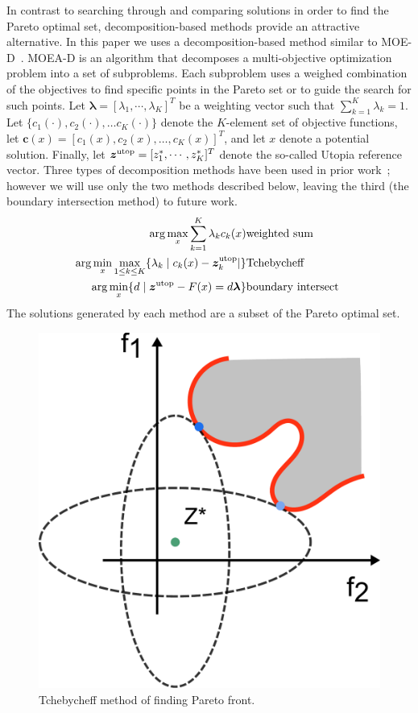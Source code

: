 \documentclass[phd]{byuprop}
\begin{document}
In contrast to searching through and comparing solutions in order to find the Pareto optimal set, decomposition-based methods provide an attractive alternative.  
In this paper we uses a decomposition-based method similar to MOE-D~\cite{Zhang2007}.  
MOEA-D is an algorithm that decomposes a multi-objective optimization problem into a set of subproblems.  
Each subproblem uses a weighed combination of the objectives to find specific points in the Pareto set or to guide the search for such points.  
Let $ \bm{\lambda} = [ \lambda_{1} , \cdots , \lambda_{K}  ]^{T} $ be a weighting vector such that $ \sum_{k=1}^{K} \lambda_{k} = 1 $.  
Let $\{c_{1}(\cdot), c_{2}(\cdot), \ldots c_{K}(\cdot)\}$ denote the $K$-element set of objective functions, let $\bm{c}(x) = [c_{1}(x), c_{2}(x), \ldots, c_{K}(x)]^T$, and let $x$ denote a potential solution.  
Finally, let $ \bm{z}^{\rm utop} = [z^{*}_{1}, \cdots , z^{*}_{K}]^{T} $ denote the so-called Utopia reference vector. %
Three types of decomposition methods have been used in prior work~\cite{Zhang2007}; however we will use only the two methods described below, leaving the third (the boundary intersection method) to future work.
\begin{eqnarray}
 \arg\max_x \sum_{k=1}^{K} \lambda_{k} c_{k} (x) & {\rm weighted \ sum} \label{eq:weighted}\\
 \arg\min_x\max_{1 \leq k \leq K}  \{ \lambda_{k} \mid c_{k}(x) - \bm{z}^{\rm utop}_{k}  | \} & {\rm Tchebycheff} \label{eq:Tchebycheff}\\
 \arg\min_x \{ d \mid \bm{z}^{\rm utop} - F(x) = d \bm{\lambda} \} & {\rm boundary \ intersect\ } \label{eq:boundary}
\end{eqnarray}
The solutions generated by each method are a subset of the Pareto optimal set.

\begin{figure}[htbp]
\centering
\includegraphics[width=0.35\linewidth]{fig/Tchebycheff}
\caption{Tchebycheff method of finding Pareto front.}
\label{fig:Tchebycheff}
\end{figure}
\end{document}
